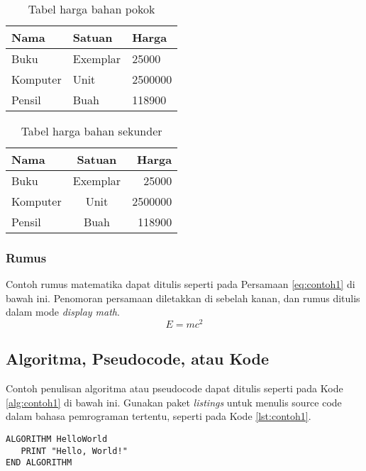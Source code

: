 \documentclass[12pt,a4paper,oneside]{book}
\begin{document}
\begin{table}[t] %
  \begin{tabular}{ | p{2cm} | p{2cm} | p{3cm} |}
	\hline
	Nama 	& Satuan 		& Harga \\
	\hline
	Buku 	& Exemplar	& 25000 \\
	Komputer	& Unit		& 2500000 \\
	Pensil	& Buah		& 118900 \\
	\hline
	\end{tabular}
\caption{Tabel harga bahan pokok}
\label{tbl:harga1}
\end{table}

\begin{table}[h] %
	\begin{tabular}{ | l | c | r | }
	\hline
	Nama 	& Satuan 		& Harga \\
	\hline
	Buku 	& Exemplar	& 25000 \\
	Komputer	& Unit		& 2500000 \\
	Pensil	& Buah		& 118900 \\
	\hline
	\end{tabular}
\caption{Tabel harga bahan sekunder}
\label{tbl:harga2}
\end{table}

\subsubsection{Rumus}
Contoh rumus matematika dapat ditulis seperti pada Persamaan \ref{eq:contoh1} di bawah ini. 
Penomoran persamaan diletakkan di sebelah kanan, dan rumus ditulis dalam mode \textit{display math}.
\begin{equation}
E = mc^2
\label{eq:contoh1}
\end{equation}

\subsection{Algoritma, Pseudocode, atau Kode}
Contoh penulisan algoritma atau pseudocode dapat ditulis seperti pada Kode \ref{alg:contoh1} di bawah ini. 
Gunakan paket \textit{listings} untuk menulis source code dalam bahasa pemrograman tertentu, seperti pada Kode \ref{lst:contoh1}. 


\begin{minipage}{\textwidth} 
\begin{lstlisting}[frame=lines, captionpos=t, caption={Contoh pseudocode}, label={alg:contoh1}]
ALGORITHM HelloWorld
   PRINT "Hello, World!"
END ALGORITHM
\end{lstlisting}
\end{minipage}
\end{document}
